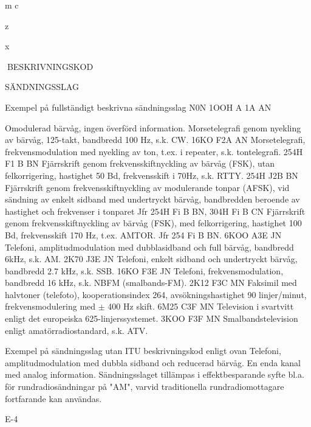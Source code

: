m
c

z

x

BESKRIVNINGSKOD

SÄNDNINGSSLAG

Exempel på fullständigt beskrivna sändningsslag
N0N
1OOH A 1A AN

Omodulerad bärvåg, ingen överförd information.
Morsetelegrafi genom nyekling av bärvåg, 125-takt, bandbredd 100 Hz, s.k. CW.
16KO F2A AN Morsetelegrafi, frekvensmodulation med nyekling av ton,
t.ex. i repeater, s.k. tontelegrafi.
254H F1 B BN Fjärrskrift genom frekvensskiftnyckling av bärvåg (FSK),
utan felkorrigering, hastighet 50 Bd, frekvensskift i 70Hz,
s.k. RTTY.
254H J2B BN Fjärrskrift genom frekvensskiftnyckling av modulerande
tonpar (AFSK), vid sändning av enkelt sidband med undertryckt bärvåg, bandbredden beroende av hastighet och
frekvenser i tonparet
Jfr 254H Fi B BN,
304H Fi B CN Fjärrskrift genom frekvensskiftnyckling av bärvåg (FSK),
med felkorrigering, hastighet 100 Bd, frekvensskift 170
Hz, t.ex. AMTOR. Jfr 254 Fi B BN.
6KOO A3E JN Telefoni, amplitudmodulation med dubblasidband och full
bärvåg, bandbredd 6kHz, s.k. AM.
2K70 J3E JN Telefoni, enkelt sidband och undertryckt bärvåg, bandbredd 2.7 kHz, s.k. SSB.
16KO F3E JN
Telefoni, frekvensmodulation, bandbredd 16 kHz, s.k.
NBFM (smalbands-FM).
2K12 F3C MN Faksimil med halvtoner (telefoto), kooperationsindex 264,
avsökningshastighet 90 linjer/minut, frekvensmodulering
med $\pm$ 400 Hz skift.
6M25 C3F MN Television i svartvitt enligt det europeiska 625-linjerssystemet.
3KOO F3F MN Smalbandstelevision enligt amatörradiostandard, s.k. ATV.

Exempel på sändningsslag utan ITU beskrivningskod enligt ovan
Telefoni, amplitudmodulation med dubbla sidband och
reducerad bärvåg.
En enda kanal med analog information.
Sändningsslaget tillämpas i effektbesparande syfte bl.a.
för rundradiosändningar på "AM", varvid traditionella
rundradiomottagare fortfarande kan användas.

E-4
